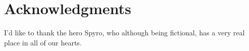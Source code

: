 \section*{Acknowledgments} %


I'd like to thank the hero Spyro, who although being fictional, has a very real place in all of our hearts.

